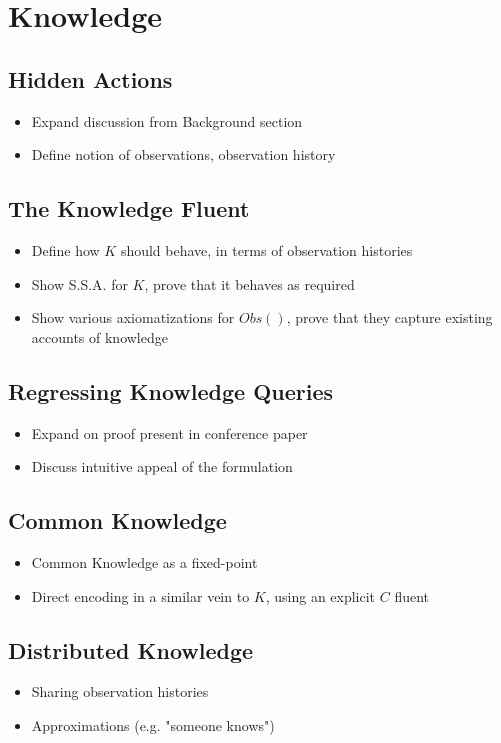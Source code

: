 \chapter{Knowledge}\label{ch:knowledge}

\section{Hidden Actions}

\begin{itemize}
\item Expand discussion from Background section
\item Define notion of observations, observation history
\end{itemize}

\section{The Knowledge Fluent}

\begin{itemize}
\item Define how $K$ should behave, in terms of observation histories
\item Show S.S.A. for $K$, prove that it behaves as required
\item Show various axiomatizations for $Obs()$, prove that they capture
existing accounts of knowledge
\end{itemize}

\section{Regressing Knowledge Queries}

\begin{itemize}
\item Expand on proof present in conference paper
\item Discuss intuitive appeal of the formulation
\end{itemize}

\section{Common Knowledge}

\begin{itemize}
\item Common Knowledge as a fixed-point
\item Direct encoding in a similar vein to $K$, using an explicit $C$ fluent
\end{itemize}

\section{Distributed Knowledge}

\begin{itemize}
\item Sharing observation histories
\item Approximations (e.g. "someone knows")
\end{itemize}


